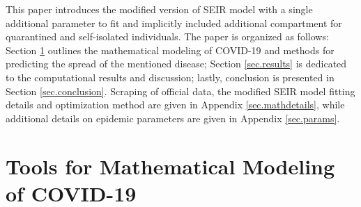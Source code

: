 \documentclass[conference]{IEEEtran}
\begin{document}
This paper introduces the modified version of SEIR model with a single additional parameter to fit and implicitly included additional compartment for quarantined and self-isolated individuals. The paper is organized as follows: Section \ref{sec.modeling} outlines the mathematical modeling of COVID-19 and methods for predicting the spread of the mentioned disease; Section \ref{sec.results} is dedicated to the computational results and discussion; lastly, conclusion is presented in Section \ref{sec.conclusion}. Scraping of official data, the modified SEIR model fitting details and optimization method are given in Appendix \ref{sec.mathdetails}, while additional details on epidemic parameters are given in Appendix \ref{sec.params}. 

\section{Tools for Mathematical Modeling of COVID-19}
\label{sec.modeling}
\end{document}
